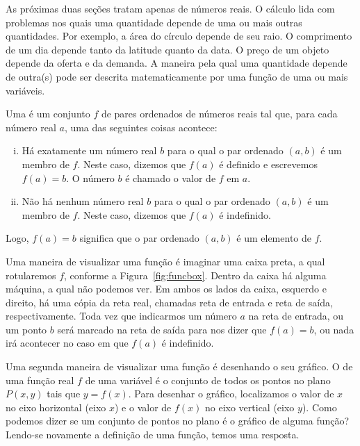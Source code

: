 As próximas duas seções tratam apenas de números reais. O cálculo
lida com problemas nos quais uma quantidade depende de uma ou mais
outras quantidades. Por exemplo, a área do círculo depende de seu
raio. O comprimento de um dia depende tanto da latitude quanto da
data. O preço de um objeto depende da oferta e da demanda. A maneira
pela qual uma quantidade depende de outra(s) pode ser descrita
matematicamente por uma função de uma ou mais variáveis.

\begin{defin}
Uma  é um conjunto $f$ de pares
ordenados de números reais tal que, para cada número real $a$, uma
das seguintes coisas acontece:

\begin{enumerate}[(i)]
\item Há exatamente um número real $b$ para o qual o par ordenado $(a,b)$
é um membro de $f$. Neste caso, dizemos que $f(a)$ é definido e
escrevemos $f(a) = b$. O número $b$ é chamado o valor de $f$ em $a$.
\item Não há nenhum número real $b$ para o qual o par ordenado $(a,b)$
é um membro de $f$. Neste caso, dizemos que $f(a)$ é indefinido.
\end{enumerate}
\end{defin}

Logo, $f(a) = b$ significa que o par ordenado $(a,b)$ é um elemento
de $f$.

Uma maneira de visualizar uma função é imaginar uma caixa preta, a qual
rotularemos $f$, conforme a Figura~\ref{fig:funcbox}. Dentro da caixa há
alguma máquina, a qual não podemos ver. Em ambos os lados da caixa,
esquerdo e direito, há uma cópia da reta real, chamadas reta de entrada
e reta de saída, respectivamente. Toda vez que indicarmos um número $a$
na reta de entrada, ou um ponto $b$ será marcado na reta de saída para
nos dizer que $f(a) = b$, ou nada irá acontecer no caso em que $f(a)$
é indefinido.


Uma segunda maneira de visualizar uma função é desenhando o seu gráfico.
O  de uma função real $f$ de uma variável é o conjunto de
todos os pontos no plano $P(x,y)$ tais que $y = f(x)$. Para desenhar o
gráfico, localizamos o valor de $x$ no eixo horizontal (eixo $x$) e
o valor de $f(x)$ no eixo vertical (eixo $y$). Como podemos dizer se
um conjunto de pontos no plano é o gráfico de alguma função? Lendo-se
novamente a definição de uma função, temos uma resposta.

